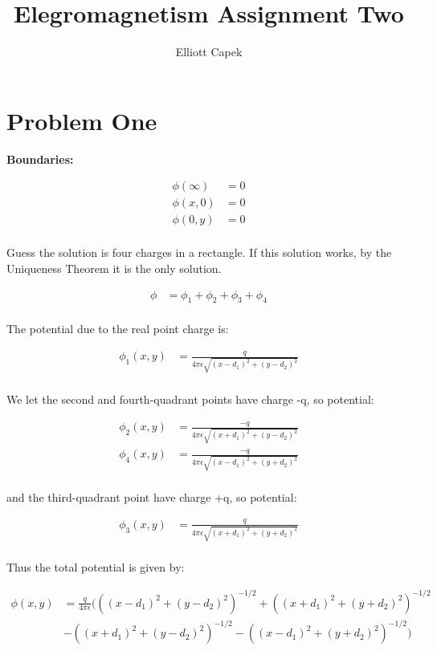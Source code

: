 \documentclass[10pt]{article} %
\title{Elegromagnetism Assignment Two}
\author{Elliott Capek}
\begin{document}
\maketitle{}

\section{Problem One}
\textbf{Boundaries:}

\begin{align*}
  \phi(\infty) &= 0\\
  \phi(x,0) &= 0\\
  \phi(0,y) &= 0\\
\end{align*}

Guess the solution is four charges in a rectangle. If this solution works, by the Uniqueness Theorem it is the only solution.

\begin{align*}
  \phi &= \phi_1 + \phi_2 + \phi_3 + \phi_4\\
\end{align*}

The potential due to the real point charge is:

\begin{align*}
  \phi_1(x,y) &= \frac{q}{4\pi\epsilon\sqrt{(x-d_1)^2+(y-d_2)^2}}\\
\end{align*}

We let the second and fourth-quadrant points have charge -q, so potential:

\begin{align*}
  \phi_2(x,y) &= \frac{-q}{4\pi\epsilon\sqrt{(x+d_1)^2+(y-d_2)^2}}\\
  \phi_4(x,y) &= \frac{-q}{4\pi\epsilon\sqrt{(x-d_1)^2+(y+d_2)^2}}\\
\end{align*}

and the third-quadrant point have charge +q, so potential:

\begin{align*}
  \phi_3(x,y) &= \frac{q}{4\pi\epsilon\sqrt{(x+d_1)^2+(y+d_2)^2}}\\
\end{align*}

Thus the total potential is given by:

\begin{align*}
  \phi(x,y) &= \frac{q}{4\pi\epsilon}\Big(
  \left((x-d_1)^2+(y-d_2)^2\right)^{-1/2} + \left((x+d_1)^2+(y+d_2)^2\right)^{-1/2}\\
  &-\left((x+d_1)^2+(y-d_2)^2\right)^{-1/2} - \left((x-d_1)^2+(y+d_2)^2\right)^{-1/2}\Big)
\end{align*}
\end{document}
